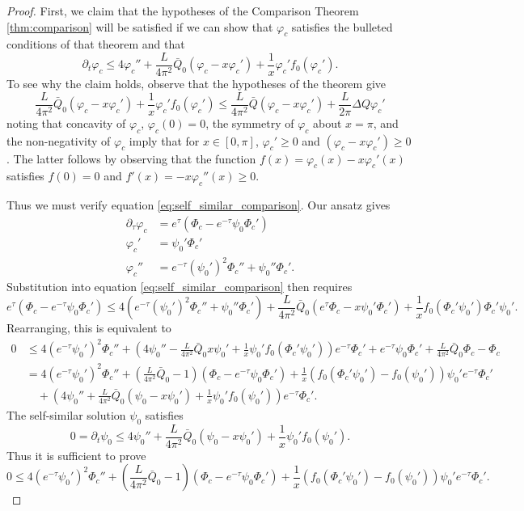 \documentclass[a4paper, 12pt]{amsart}
\begin{document}
\begin{proof}
First, we claim that the hypotheses of the Comparison Theorem \ref{thm:comparison} will be satisfied if we can show that $\varphi_c$ satisfies the bulleted conditions of that theorem and that
\begin{equation}
\label{eq:self_similar_comparison}
\partial_t \varphi_c \leq 4 \varphi_c'' + \frac{L}{4\pi^2} \bar{Q}_0 (\varphi_c - x\varphi_c') + \frac{1}{x} \varphi_c' f_0 (\varphi_c').
\end{equation}
To see why the claim holds, observe that the hypotheses of the theorem give
\[
\frac{L}{4\pi^2} \bar{Q}_0 (\varphi_c - x\varphi_c') + \frac{1}{x} \varphi_c' f_0 (\varphi_c') \leq \frac{L}{4\pi^2} \bar{Q} (\varphi_c - x\varphi_c') + \frac{L}{2\pi} \Delta Q \varphi_c'
\]
noting that concavity of $\varphi_c$, $\varphi_c(0) = 0$, the symmetry of $\varphi_c$ about $x=\pi$, and the non-negativity of $\varphi_c$ imply that for $x \in [0, \pi]$, $\varphi_c' \geq 0$ and $(\varphi_c - x \varphi_c') \geq 0$. The latter follows by observing that the function $f(x) = \varphi_c(x) - x \varphi_c'(x)$ satisfies $f(0) = 0$ and $f'(x) = -x \varphi_c''(x) \geq 0$.

Thus we must verify equation \eqref{eq:self_similar_comparison}. Our ansatz gives
\begin{align*}
\partial_{\tau} \varphi_c &= e^{\tau} \left(\Phi_c - e^{-\tau} \psi_0 \Phi_c'\right) \\
\varphi_c' &= \psi_0' \Phi_c' \\
\varphi_c'' &= e^{-\tau} (\psi_0')^2 \Phi_c'' + \psi_0'' \Phi_c'.
\end{align*}
Substitution into equation \eqref{eq:self_similar_comparison} then requires
\[
e^{\tau} \left(\Phi_c - e^{-\tau} \psi_0 \Phi_c'\right) \leq 4 \left(e^{-\tau} (\psi_0')^2 \Phi_c'' + \psi_0'' \Phi_c'\right) + \frac{L}{4\pi^2} \bar{Q}_0 (e^{\tau} \Phi_c - x \psi_0' \Phi_c') + \frac{1}{x} f_0(\Phi_c' \psi_0') \Phi_c' \psi_0'.
\]
Rearranging, this is equivalent to
\[
\begin{split}
0 &\leq 4 (e^{-\tau} \psi_0')^2 \Phi_c'' + \left(4\psi_0'' - \frac{L}{4\pi^2} \bar{Q}_0 x \psi_0' + \frac{1}{x} \psi_0'f_0(\Phi_c' \psi_0') \right) e^{-\tau} \Phi_c' + e^{-\tau} \psi_0 \Phi_c' + \frac{L}{4\pi^2} \bar{Q}_0 \Phi_c - \Phi_c \\
&= 4 (e^{-\tau} \psi_0')^2 \Phi_c'' + \left(\frac{L}{4\pi^2} \bar{Q}_0 - 1\right) \left(\Phi_c - e^{-\tau} \psi_0 \Phi_c'\right) + \frac{1}{x} \left(f_0(\Phi_c' \psi_0') - f_0(\psi_0')\right) \psi_0' e^{-\tau} \Phi_c'\\
&\quad + \left(4\psi_0'' + \frac{L}{4\pi^2} \bar{Q}_0 (\psi_0 - x \psi_0') + \frac{1}{x} \psi_0' f_0(\psi_0')\right) e^{-\tau} \Phi_c'.
\end{split}
\]
The self-similar solution $\psi_0$ satisfies
\[
0 = \partial_t \psi_0 \leq 4\psi_0'' + \frac{L}{4\pi^2} \bar{Q}_0 (\psi_0 - x \psi_0') + \frac{1}{x} \psi_0' f_0(\psi_0').
\]
Thus it is sufficient to prove
\[
0 \leq 4 (e^{-\tau} \psi_0')^2 \Phi_c'' + \left(\frac{L}{4\pi^2} \bar{Q}_0 - 1\right) \left(\Phi_c - e^{-\tau} \psi_0 \Phi_c'\right) + \frac{1}{x} \left(f_0(\Phi_c' \psi_0') - f_0(\psi_0')\right) \psi_0' e^{-\tau} \Phi_c'.
\]


\end{proof}
\end{document}
